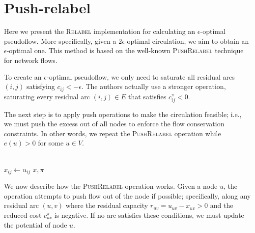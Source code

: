 \section{Push-relabel}

Here we present the \textsc{Relabel} implementation for calculating an $\epsilon$-optimal pseudoflow. More specifically, given a $2\epsilon$-optimal circulation, we aim to obtain an $\epsilon$-optimal one. This method is based on the well-known \textsc{PushRelabel} technique for network flows.

To create an $\epsilon$-optimal pseudoflow, we only need to saturate all residual arcs $(i,j)$ satisfying $c_{ij} < -\epsilon$. The authors actually use a stronger operation, saturating every residual arc $(i,j) \in E$ that satisfies $c_{ij}^\pi < 0$.

The next step is to apply push operations to make the circulation feasible; i.e., we must push the excess out of all nodes to enforce the flow conservation constraints. In other words, we repeat the \textsc{PushRelabel} operation while $e(u) > 0$ for some $u \in V$.

\begin{algorithm}[H]
\caption{Push-relabel version of \textsc{Refine}}
\label{alg:push_relabel_refine}
    \begin{algorithmic}[1]
                \State {}
            \Else
                \State {}
            \EndIf
        \EndProcedure
        \\
                \State $x_{ij} \gets u_{ij}$ 
            \EndFor
                \State{}
            \EndWhile
            \State \Return $x, \pi$
        \EndProcedure
    \end{algorithmic}
\end{algorithm}

We now describe how the \textsc{PushRelabel} operation works. Given a node $u$, the operation attempts to push flow out of the node if possible; specifically, along any residual arc $(u, v)$ where the residual capacity $r_{uv} = u_{uv} - x_{uv} > 0$ and the reduced cost $c_{uv}^\pi$ is negative. If no arc satisfies these conditions, we must update the potential of node $u$.

